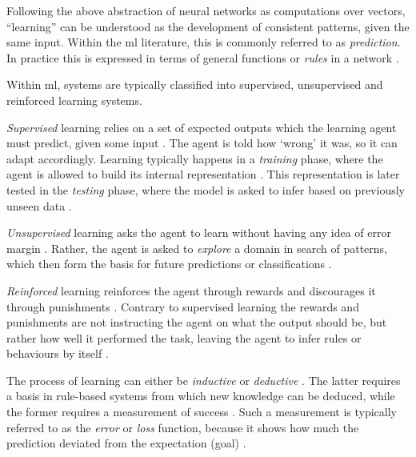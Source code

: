 \documentclass[report.tex]{subfiles}
\begin{document}
Following the above abstraction of neural networks as computations over vectors,
``learning''  can be understood as the development of consistent
patterns, given the same input.
Within the \gls{ml} literature, this is commonly referred to as 
\textit{prediction}. 
In practice this is expressed in terms of general functions or
\textit{rules} in a network \cite[p. 704.]{Russel2007}.

Within \gls{ml}, systems are typically classified into
supervised, 
unsupervised  and reinforced learning systems.

\textit{Supervised} learning relies on a set of expected outputs which 
the learning \gls{agent} must predict, given some input \cite{Russel2007}.
The \gls{agent} is told how `wrong' it was, so it can adapt accordingly.
Learning typically happens in a \textit{training} 
phase, where the \gls{agent} is allowed to build its internal representation 
\cite{Russel2007}.
This representation is later tested in the \textit{testing} phase, 
where the model is asked to infer based on previously unseen data \cite{Russel2007}.

\textit{Unsupervised} learning asks the \gls{agent} to learn without
having any idea of error margin \cite{Russel2007}.
Rather, the \gls{agent} is asked to \textit{explore} a domain in search of
patterns, which then form the basis for future predictions or classifications
\cite{Russel2007}.

\textit{Reinforced} learning reinforces the \gls{agent} through
rewards and discourages it through punishments \cite{Russel2007}.
Contrary to supervised learning the rewards and punishments are not
instructing the agent on what the output should be, but rather how well
it performed the task, leaving the \gls{agent} to infer rules or
behaviours by itself \cite[p. 873]{Russel2007}.

The process of learning can either be \textit{inductive}
or \textit{deductive} \cite[p. 704]{Russel2007}.
The latter requires a basis in rule-based systems from which new knowledge can
be deduced, while the former requires a measurement of success \cite[p. 705]{Russel2007}.
Such a measurement is typically referred to as the \textit{error} or \textit{loss}
function,
because it shows how much the prediction deviated from the expectation (goal)
\cite{Russel2007}.
\end{document}
